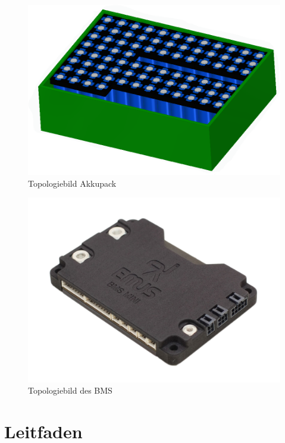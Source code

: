 \begin{figure} [H]
	\begin{center}
		\includegraphics[scale=0.75] {figures/Akku/Akkubox1.PNG}
		\caption{Topologiebild Akkupack}
	\end{center}
\end{figure}

\begin{figure} [H]
	\begin{center}
		\includegraphics[scale=0.2] {figures/Akku/BMSMINI.jpg}
		\caption{Topologiebild des BMS}
	\end{center}
\end{figure}

\newpage

\section{Leitfaden}

